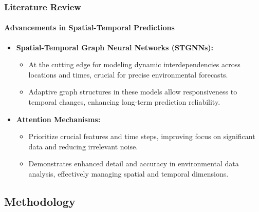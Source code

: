 \documentclass[light]{lutbeamer} %
\begin{document}
\begin{frame}
    \frametitle{Literature Review}
    \framesubtitle{Advancements in Spatial-Temporal Predictions}
    \begin{itemize}
        \item \textbf{Spatial-Temporal Graph Neural Networks (STGNNs):}
              \begin{itemize}
                  \item At the cutting edge for modeling dynamic interdependencies across locations and times, crucial for precise environmental forecasts.
                  \item Adaptive graph structures in these models allow responsiveness to temporal changes, enhancing long-term prediction reliability.
              \end{itemize}
        \item \textbf{Attention Mechanisms:}
              \begin{itemize}
                  \item Prioritize crucial features and time steps, improving focus on significant data and reducing irrelevant noise.
                  \item Demonstrates enhanced detail and accuracy in environmental data analysis, effectively managing spatial and temporal dimensions.
              \end{itemize}
    \end{itemize}
\end{frame}

\subsection{Methodology}
\end{document}
